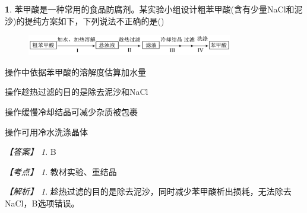 \documentclass[UTF8, 10pt, a4paper, oneside]{ctexart}
\newcommand{\fs}[1]{{\fangsong #1}}%
\newcommand{\Romannumeral}[1]{\uppercase\expandafter{\romannumeral#1}}%
\theoremstyle{definition}
\newtheorem{subexercise}{}[exercise]%
\theoremstyle{remark}
\newtheorem*{answer}{【答案】}
\newtheorem*{point}{【考点】}      %
\newtheorem*{explanation}{【解析】}     %
\theoremstyle{plain}
\begin{document}
\begin{subexercise}
    \fs{[2023.6浙江]}苯甲酸是一种常用的食品防腐剂。某实验小组设计粗苯甲酸(含有少量NaCl和泥沙)的提纯方案如下，下列说法不正确的是\quad(\quad)
    \begin{figure}[ht!]
        \centering
        \includegraphics[width=0.8\textwidth, keepaspectratio]{assists/5.5.1.png}
    \end{figure}
    \begin{adjustwidth}{4em}{}
        \begin{asparaenum}[A. ]
            \item 操作\Romannumeral{1}中依据苯甲酸的溶解度估算加水量
            \item 操作\Romannumeral{2}趁热过滤的目的是除去泥沙和NaCl
            \item 操作\Romannumeral{3}缓慢冷却结晶可减少杂质被包裹
            \item 操作\Romannumeral{4}可用冷水洗涤晶体
        \end{asparaenum}
    \end{adjustwidth}
    \begin{answer}
        B
    \end{answer}
    \begin{point}
        教材实验、重结晶
    \end{point}
    \begin{explanation}
        趁热过滤的目的是除去泥沙，同时减少苯甲酸析出损耗，无法除去NaCl，B选项错误。
    \end{explanation}
\end{subexercise}
\end{document}
